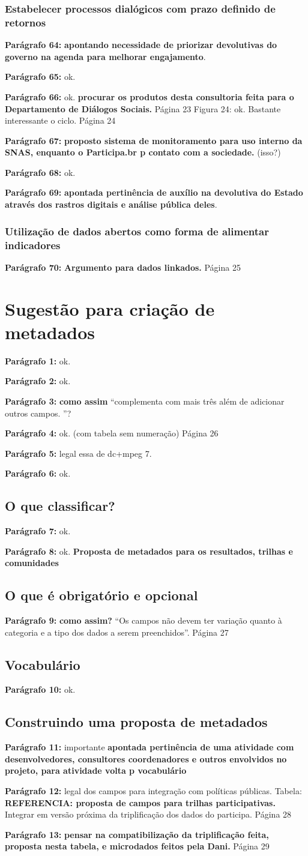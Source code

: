 \documentclass[12pt]{report}
\newcommand{\pp}[1]{

\textbf{Parágrafo #1:}
}
\begin{document}
\subsubsection{Estabelecer processos dialógicos com prazo definido de retornos}
\pp{64} {\bf \color{red} apontando necessidade de priorizar devolutivas do governo na agenda para melhorar engajamento}.
\pp{65} ok.
\pp{66} ok. {\bf \color{red} procurar os produtos desta consultoria feita para o Departamento de Diálogos Sociais.}
\noindent Página 23
Figura 24: ok. Bastante interessante o ciclo.
\noindent Página 24
\pp{67} {\bf \color{red} proposto sistema de monitoramento para uso interno da SNAS, enquanto o Participa.br p contato com a sociedade.} (isso?)
\pp{68} ok.
\pp{69} {\bf \color{red} apontada pertinência de auxílio na devolutiva do Estado através dos rastros digitais e análise pública deles}.
\subsubsection{Utilização de dados abertos como forma de alimentar indicadores}
\pp{70} {\bf \color{red} Argumento para dados linkados.}
\noindent Página 25
\section{Sugestão para criação de metadados}
\pp{1} ok.
\pp{2} ok.
\pp{3} {\bf \color{red} como assim } ``complementa com mais três além de adicionar outros campos. ''?
\pp{4} ok. (com tabela sem numeração)
\noindent Página 26
\pp{5} legal essa de dc+mpeg 7.
\pp{6} ok.
\subsection{O que classificar?}
\pp{7} ok.
\pp{8} ok. {\bf \color{red} Proposta de metadados para os resultados, trilhas e comunidades}
\subsection{O que é obrigatório e opcional}
\pp{9} {\bf \color{red} como assim?} ``Os campos não devem ter variação quanto à categoria e a tipo dos dados a serem preenchidos''.
\noindent Página 27
\subsection{Vocabulário}
\pp{10} ok.
\subsection{Construindo uma proposta de metadados}
\pp{11} importante {\bf \color{red} apontada pertinência de uma atividade com desenvolvedores, consultores coordenadores e outros envolvidos no projeto, para atividade volta p vocabulário}
\pp{12} legal dos campos para integração com políticas públicas.
Tabela: {\bf \color{red} REFERENCIA: proposta de campos para trilhas participativas.} Integrar em versão próxima da triplificação dos dados do participa.
\noindent Página 28
\pp{13} {\bf pensar na compatibilização da triplificação feita, proposta nesta tabela, e microdados feitos pela Dani.}
\noindent Página 29
\end{document}
